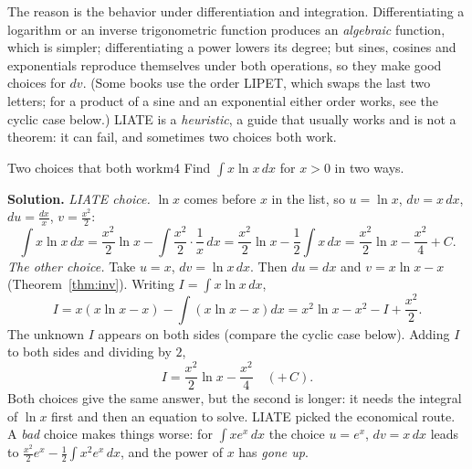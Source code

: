 \documentclass[11pt]{article}
\begin{document}
The reason is the behavior under differentiation and integration. Differentiating a logarithm or an inverse trigonometric function produces an \emph{algebraic} function, which is simpler; differentiating a power lowers its degree; but sines, cosines and exponentials reproduce themselves under both operations, so they make good choices for $dv$. (Some books use the order LIPET, which swaps the last two letters; for a product of a sine and an exponential either order works, see the cyclic case below.) LIATE is a \emph{heuristic}, a guide that usually works and is not a theorem: it can fail, and sometimes two choices both work.

\begin{exmp}{Two choices that both work}{m4}
Find $\int x\ln x\,dx$ for $x>0$ in two ways.

\textbf{Solution.} \emph{LIATE choice.} $\ln x$ comes before $x$ in the list, so $u=\ln x$, $dv=x\,dx$, $du=\frac{dx}x$, $v=\frac{x^2}2$:
\[\int x\ln x\,dx=\frac{x^2}2\ln x-\int\frac{x^2}2\cdot\frac1x\,dx=\frac{x^2}2\ln x-\frac12\int x\,dx=\frac{x^2}2\ln x-\frac{x^2}4+C .\]
\emph{The other choice.} Take $u=x$, $dv=\ln x\,dx$. Then $du=dx$ and $v=x\ln x-x$ (Theorem~\ref{thm:inv}). Writing $I=\int x\ln x\,dx$,
\[I=x\left(x\ln x-x\right)-\int\left(x\ln x-x\right)dx=x^2\ln x-x^2-I+\frac{x^2}2 .\]
The unknown $I$ appears on both sides (compare the cyclic case below). Adding $I$ to both sides and dividing by $2$,
\[I=\frac{x^2}2\ln x-\frac{x^2}4\quad(+\,C).\]
Both choices give the same answer, but the second is longer: it needs the integral of $\ln x$ first and then an equation to solve. LIATE picked the economical route. A \emph{bad} choice makes things worse: for $\int xe^x\,dx$ the choice $u=e^x$, $dv=x\,dx$ leads to $\frac{x^2}2e^x-\frac12\int x^2e^x\,dx$, and the power of $x$ has \emph{gone up}.
\end{exmp}
\end{document}
